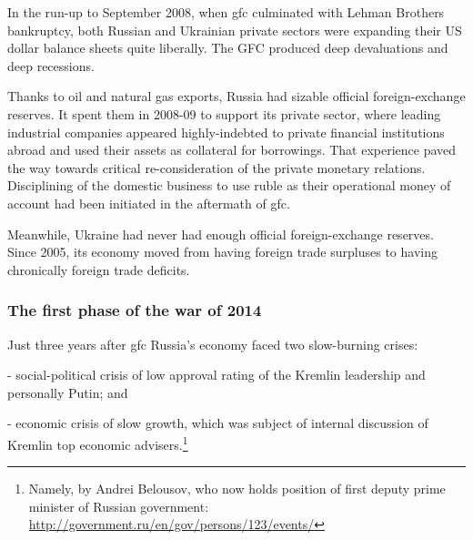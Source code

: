 In the run-up to September 2008, when \acf{gfc} culminated with Lehman Brothers bankruptcy, both Russian and Ukrainian private sectors were expanding their US dollar balance sheets quite
liberally. The GFC produced deep devaluations and deep recessions.

Thanks to oil and natural gas exports, Russia had sizable official
foreign-exchange reserves. It spent them in 2008-09 to support its
private sector, where leading industrial companies appeared
highly-indebted to private financial institutions abroad and used their
assets as collateral for borrowings. That experience paved the way
towards critical re-consideration of the private monetary relations.
Disciplining of the domestic business to use ruble as their operational
money of account had been initiated in the aftermath of \ac{gfc}.

Meanwhile, Ukraine had never had enough official foreign-exchange
reserves. Since 2005, its economy moved from having foreign trade
surpluses to having chronically foreign trade deficits.

\subsubsection{The first phase of the war of 2014}

Just three years after \ac{gfc} Russia's economy faced two slow-burning
crises:

-   social-political crisis of low approval rating of the Kremlin
    leadership and personally Putin; and

-   economic crisis of slow growth, which was subject of internal
    discussion of Kremlin top economic advisers.\footnote{Namely, by Andrei Belousov, who now holds position of first deputy prime minister of Russian government: \url{http://government.ru/en/gov/persons/123/events/}}

